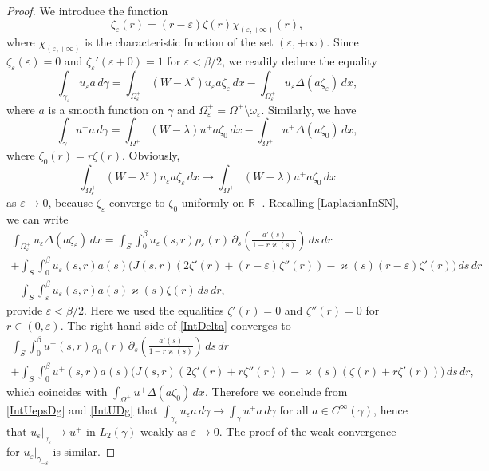 \documentclass[reqno]{amsart}
\theoremstyle{plain}
\numberwithin{equation}{section}
\renewcommand{\kappa}{\varkappa}
\newcommand{\Real}{\mathbb R}
\newcommand{\eps}{\varepsilon}
\begin{document}
\begin{proof}
We introduce the function
$$
\zeta_\eps(r)=(r-\eps)\zeta(r)\chi_{(\eps,+\infty)}(r),
$$
where $\chi_{(\eps,+\infty)}$ is the characteristic function of the set $(\eps,+\infty)$.
Since $\zeta_\eps(\eps)=0$ and $\zeta_\eps'(\eps+0)=1$ for $\eps<\beta/2$, we readily deduce  the equality
\begin{equation}\label{IntUepsDg}
  \int_{\gamma_\eps} u_\eps a \,d\gamma=\int_{\Omega^+_\eps} (W-\lambda^\eps)u_\eps a\zeta_\eps\,dx-\int_{\Omega^+_\eps} u_\eps \Delta (a\zeta_\eps)\,dx,
\end{equation}
where $a$ is a smooth function on $\gamma$ and $\Omega^+_\eps=\Omega^+\setminus\omega_\eps$.
Similarly, we have
 \begin{equation}\label{IntUDg}
  \int_{\gamma} u^+ a \,d\gamma=\int_{\Omega^+} (W-\lambda)u^+ a\zeta_0\,dx-\int_{\Omega^+} u^+ \Delta (a\zeta_0)\,dx,
\end{equation}
where $\zeta_0(r)=r\zeta(r)$.
Obviously,
\begin{equation*}
   \int_{\Omega^+_\eps} (W-\lambda^\eps)u_\eps a\zeta_\eps\,dx\to
   \int_{\Omega^+} (W-\lambda)u^+ a\zeta_0\,dx
\end{equation*}
as $\eps\to 0$, because $\zeta_\eps$ converge to $\zeta_0$ uniformly on $\Real_+$. Recalling \eqref{LaplacianInSN}, we can write
\begin{multline}\label{IntDelta}
  \int_{\Omega^+_\eps}u_\eps \Delta (a\zeta_\eps)\,dx=
  \int_{S} \int_0^\beta u_\eps(s,r)\rho_\eps(r) \,\partial_s\left(\frac{a'(s)}{1-r \kappa(s)}\right)\,ds\,dr
  \\
  +\int_{S} \int_0^\beta u_\eps(s,r)a(s)\big(J(s,r)(2\zeta'(r)+(r-\eps)\zeta''(r))
  -\kappa(s)(r-\eps)\zeta'(r)\big)\,ds\,dr\\
  -
  \int_{S} \int_\eps^\beta u_\eps(s,r)a(s)\kappa(s)\zeta(r)\,ds\,dr,
\end{multline}
provide $\eps<\beta/2$. Here we used  the equalities $\zeta'(r)=0$ and $\zeta''(r)=0$ for $r\in(0,\eps)$.
The right-hand side of \eqref{IntDelta} converges to
\begin{multline*}
   \int_{S} \int_0^\beta u^+(s,r)\rho_0(r) \,\partial_s\left(\frac{a'(s)}{1-r \kappa(s)}\right)\,ds\,dr
  \\
  +\int_{S} \int_0^\beta u^+(s,r)a(s)\big(J(s,r)(2\zeta'(r)+r\zeta''(r))
  -\kappa(s)(\zeta(r)+r\zeta'(r))\big)\,ds\,dr,
\end{multline*}
which coincides with $\int_{\Omega^+}u^+ \Delta (a\zeta_0)\,dx$.
Therefore we conclude from \eqref{IntUepsDg} and \eqref{IntUDg} that
$\int_{\gamma_\eps} u_\eps a \,d\gamma\to \int_{\gamma} u^+ a \,d\gamma$ for all $a\in C^\infty(\gamma)$, hence that  $u_\eps|_{\gamma_{\eps}}\to u^+$ in $L_2(\gamma)$ weakly as $\eps\to 0$. The proof of the weak convergence for   $u_\eps|_{\gamma_{-\eps}}$ is similar.
\end{proof}
\end{document}
